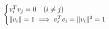 \documentclass[preview]{standalone}
\begin{document}
\begin{align*}
\special{dvisvgm:raw <g id='unique000'>}
            \begin{cases}
            v_{i}^{T} v_{j} = 0 \quad (i \ne j) \\
            \|v_{i}\| = 1 \implies v_{i}^{T} v_{i} = \|v_{i}\|^{2} = 1
            \end{cases}
        \special{dvisvgm:raw </g>}
\end{align*}
\end{document}

